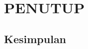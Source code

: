 \renewcommand{\thechapter}{\Roman{chapter}}
\chapter{PENUTUP}\label{babLima}
\renewcommand{\thechapter}{\arabic{chapter}}
\vspace{8mm}


\section{Kesimpulan}
\vspace{-4mm}
